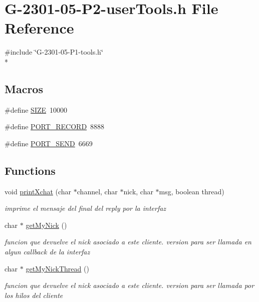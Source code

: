 \hypertarget{_g-2301-05-_p2-user_tools_8h}{\section{G-\/2301-\/05-\/\-P2-\/user\-Tools.h File Reference}
\label{_g-2301-05-_p2-user_tools_8h}
}
{\ttfamily \#include \char`\"{}G-\/2301-\/05-\/\-P1-\/tools.\-h\char`\"{}}\\*
\subsection*{Macros}
\begin{DoxyCompactItemize}
\item 
\#define \hyperlink{_g-2301-05-_p2-user_tools_8h_a70ed59adcb4159ac551058053e649640}{S\-I\-Z\-E}~10000
\item 
\#define \hyperlink{_g-2301-05-_p2-user_tools_8h_a403f3d61e6c0872cda3700219ca9ac1e}{P\-O\-R\-T\-\_\-\-R\-E\-C\-O\-R\-D}~8888
\item 
\#define \hyperlink{_g-2301-05-_p2-user_tools_8h_a40c5426015ecc21e39dfb362eb4c0c14}{P\-O\-R\-T\-\_\-\-S\-E\-N\-D}~6669
\end{DoxyCompactItemize}
\subsection*{Functions}
\begin{DoxyCompactItemize}
\item 
void \hyperlink{_g-2301-05-_p2-user_tools_8h_a3e267cdf9839a331d371dd5f980d153e}{print\-Xchat} (char $\ast$channel, char $\ast$nick, char $\ast$msg, boolean thread)
\begin{DoxyCompactList}\small\item\em imprime el mensaje del final del reply por la interfaz \end{DoxyCompactList}\item 
char $\ast$ \hyperlink{_g-2301-05-_p2-user_tools_8h_afc2d4ce661d2f13fbe4b5518d778d071}{get\-My\-Nick} ()
\begin{DoxyCompactList}\small\item\em funcion que devuelve el nick asociado a este cliente. version para ser llamada en algun callback de la interfaz \end{DoxyCompactList}\item 
char $\ast$ \hyperlink{_g-2301-05-_p2-user_tools_8h_ab409491dfa3ca1ed9713df0eabdb70ed}{get\-My\-Nick\-Thread} ()
\begin{DoxyCompactList}\small\item\em funcion que devuelve el nick asociado a este cliente. version para ser llamada por los hilos del cliente \end{DoxyCompactList}\end{DoxyCompactItemize}
